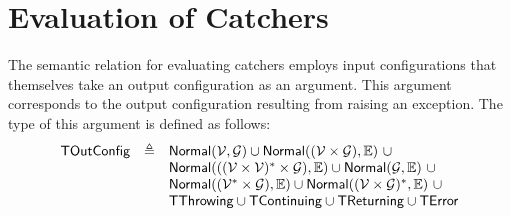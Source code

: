 \documentclass{book}
\newcommand\tododefine[1]{\texttt{#1}}
\newcommand\XGraphs[0]{\mathcal{G}}
\newcommand\vals[0]{\mathcal{V}}
\newcommand\ordered[3]{{#1}\xrightarrow{#2}{#3}}
\newcommand\evalarrow[0]{\stackrel{\mathsf{asl}}{\rightsquigarrow}}
\newcommand\TError[0]{\textsf{TError}}
\newcommand\TThrowing[0]{\textsf{TThrowing}}
\newcommand\TContinuing[0]{\textsf{TContinuing}}
\newcommand\TReturning[0]{\textsf{TReturning}}
\newcommand\TOutConfig[0]{\textsf{TOutConfig}}
\newcommand\evalfor[1]{\texttt{eval\_for}(#1)}
\newcommand\Normal[0]{\textsf{Normal}}
\newcommand\env[0]{\texttt{env}}
\newcommand\vgone[0]{\texttt{g1}}
\newcommand\vstart[0]{\texttt{v\_start}}
\newcommand\vend[0]{\texttt{v\_end}}
\newcommand\body[0]{\text{body}}
\newcommand\dir[0]{\texttt{dir}}
\newcommand\condm[0]{\texttt{cond\_m}}
\newcommand\condv[0]{\texttt{cond\_v}}
\newcommand\condg[0]{\texttt{cond\_g}}
\newcommand\vindexname[0]{\texttt{index\_name}}
\begin{document}
\begin{emptyformal}

\end{emptyformal}


\chapter{Evaluation of Catchers \label{chap:eval_catchers}}

The semantic relation for evaluating catchers employs input configurations
that themselves take an output configuration as an argument.
This argument corresponds to the output configuration resulting from raising
an exception.
The type of this argument is defined as follows:
\[
  \begin{array}{rcl}
    \TOutConfig          &\triangleq& \Normal(\vals, \XGraphs) \cup \Normal((\vals \times \XGraphs), \envs)\ \cup \\
    & & \Normal(((\vals \times \vals)^* \times \XGraphs), \envs) \cup  \Normal(\XGraphs, \envs)\ \cup   \\
    & & \Normal((\vals^* \times \XGraphs), \envs) \cup \Normal((\vals\times\XGraphs)^*, \envs)\ \cup \\
    & & \TThrowing \cup \TContinuing \cup \TReturning \cup \TError
  \end{array}
\]
\end{document}
